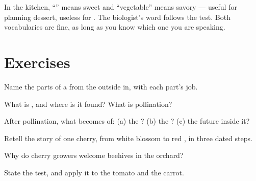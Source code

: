 \begin{remark}\label{rem:g3:flowers-fruits-seeds:words}
In the kitchen, ``'' means sweet and ``vegetable'' means
savory --- useful for planning dessert, useless for . The
biologist's word follows the  test. Both vocabularies are
fine, as long as you know which one you are speaking.
\end{remark}

\section{Exercises}

\begin{exercise}[$\star$]\label{exo:g3:flowers-fruits-seeds:1}
Name the parts of a  from the outside in, with each part's
job.
\end{exercise}

\begin{exercise}[$\star$]\label{exo:g3:flowers-fruits-seeds:2}
What is , and where is it found? What is pollination?
\end{exercise}

\begin{exercise}[$\star$]\label{exo:g3:flowers-fruits-seeds:3}
After pollination, what becomes of: (a) the ? (b) the
? (c) the future  inside it?
\end{exercise}

\begin{exercise}[$\star$]\label{exo:g3:flowers-fruits-seeds:4}
Retell the story of one cherry, from white blossom to red ,
in three dated steps.
\end{exercise}

\begin{exercise}[$\star$]\label{exo:g3:flowers-fruits-seeds:5}
Why do cherry growers welcome beehives in the orchard?
\end{exercise}

\begin{exercise}[$\star$]\label{exo:g3:flowers-fruits-seeds:6}
State the  test, and apply it to the tomato and the carrot.
\end{exercise}

